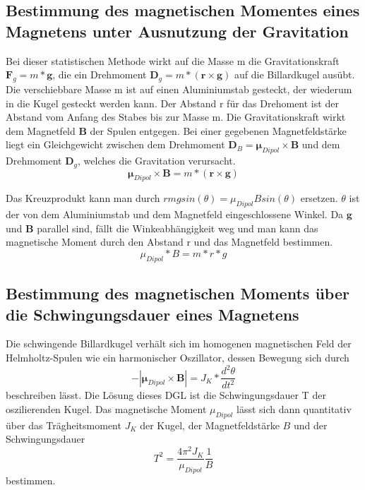 \subsection{Bestimmung des magnetischen Momentes eines Magnetens unter Ausnutzung der Gravitation}
\label{sec:Gravitation}
Bei dieser statistischen Methode wirkt auf die Masse m die Gravitationskraft $\symbf{F}_g = m * \symbf{g}$, 
die ein Drehmoment $\symbf{D}_g = m * (\symbf{r} \times \symbf{g})$ auf die Billardkugel ausübt.
Die verschiebbare Masse m ist auf einen Aluminiumstab gesteckt, der wiederum in die Kugel gesteckt werden kann.
Der Abstand r für das Drehoment ist der Abstand vom Anfang des Stabes bis zur Masse m.
Die Gravitationskraft wirkt dem Magnetfeld $\symbf{B}$ der Spulen entgegen.
Bei einer gegebenen Magnetfeldstärke liegt ein Gleichgewicht zwischen dem Drehmoment $\symbf{D}_B = \symbf{\mu}_{Dipol} \times \symbf{B}$ und dem Drehmoment $\symbf{D}_g$,
welches die Gravitation verursacht.
\begin{equation}
    \symbf{\mu}_{Dipol} \times \symbf{B} = m * (\symbf{r} \times \symbf{g})
\end{equation}

Das Kreuzprodukt kann man durch $ r m g sin(\theta) = \mu_{Dipol} B sin(\theta)$ ersetzen.
$\theta$ ist der von dem Aluminiumstab und dem Magnetfeld eingeschlossene Winkel.
Da $\symbf{g}$ und $\symbf{B}$ parallel sind, fällt die Winkeabhängigkeit weg und man kann das magnetische Moment durch den Abstand r und das Magnetfeld bestimmen.
\begin{equation}
    \mu_{Dipol} * B = m * r * g
\end{equation}


\subsection{Bestimmung des magnetischen Moments über die Schwingungsdauer eines Magnetens}
\label{sec:Schwingungsdauer}
Die schwingende Billardkugel verhält sich im homogenen magnetischen Feld der Helmholtz-Spulen wie ein harmonischer Oszillator, 
dessen Bewegung sich durch 
\begin{equation}
    -|\symbf{\mu}_{Dipol} \times \symbf{B}| = J_K * \frac{d^2\theta}{dt^2}
\end{equation}
beschreiben lässt. Die Lösung dieses DGL ist die Schwingungsdauer T der oszilierenden Kugel.
Das magnetische Moment $\mu_{Dipol}$ lässt sich dann quantitativ über das Trägheitsmoment $J_K$ der Kugel,
der Magnetfeldstärke $B$ und der Schwingungsdauer
\begin{equation}
    T^2 = \frac{4 \pi^2 J_K}{\mu_{Dipol}} \frac{1}{B}
\end{equation}
bestimmen.

